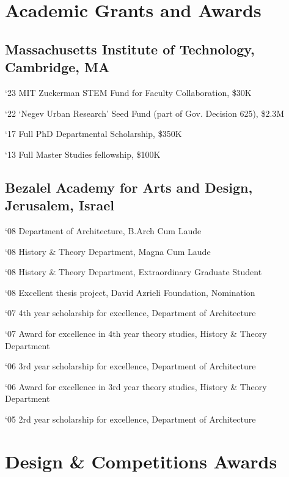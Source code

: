 \section*{Academic Grants and Awards}

\subsection*{Massachusetts Institute of Technology, Cambridge, MA}
\begin{tablist}
        \item[`23] \tab MIT Zuckerman STEM Fund for Faculty Collaboration, \$30K
        \item[`22] \tab `Negev Urban Research' Seed Fund (part of Gov. Decision 625), \$2.3M
	\item[`17] \tab Full PhD Departmental Scholarship, \$350K
	\item[`13] \tab Full Master Studies fellowship, \$100K
\end{tablist}
    
\subsection*{Bezalel Academy for Arts and Design, Jerusalem, Israel}
\begin{tablist}
	\item[`08] \tab Department of Architecture, B.Arch Cum Laude
	\item[`08] \tab History \& Theory Department, Magna Cum Laude
	\item[`08] \tab History \& Theory Department, Extraordinary Graduate Student
	\item[`08] \tab Excellent thesis project, David Azrieli Foundation, Nomination 
	\item[`07] \tab 4th year scholarship for excellence, Department of Architecture \item[`07]\tab  Award for excellence in 4th year theory studies, History \& Theory Department 
	\item[`06]\tab  3rd year scholarship for excellence, Department of Architecture \item[`06]\tab  Award for excellence in 3rd year theory studies, History \& Theory Department
	\item[`05]\tab  2rd year scholarship for excellence, Department of Architecture
	       
\end{tablist}
    
\section*{Design \& Competitions Awards}

